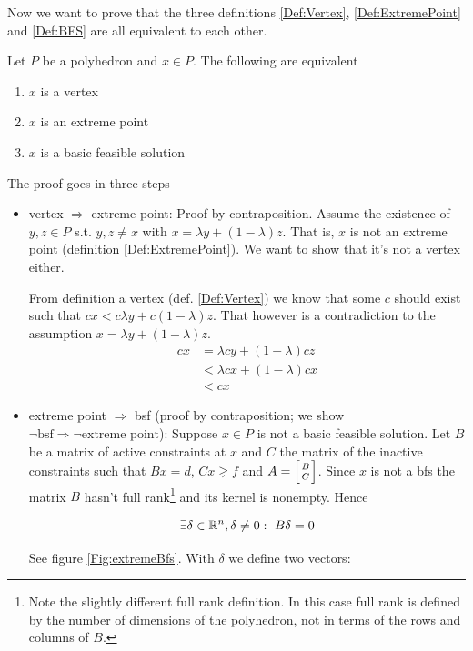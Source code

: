 Now we want to prove that the three definitions \ref{Def:Vertex}, \ref{Def:ExtremePoint} and \ref{Def:BFS} are all equivalent to each other.

\begin{thm} \label{Thm:cornerEquiv} Let $P$ be a polyhedron and $x\in P$. The following are equivalent
\begin{enumerate}
\item $x$ is a vertex
\item $x$ is an extreme point
\item $x$ is a basic feasible solution
\end{enumerate}
\end{thm}

\begin{pr} The proof goes in three steps
\begin{itemize}
\item vertex $\Rightarrow$ extreme point: Proof by contraposition. Assume the existence of $y,z \in P$ s.t. $y,z\neq x$ with $x= \lambda y + (1-\lambda )z$. That is, $x$ is not an extreme point (definition \ref{Def:ExtremePoint}). We want to show that it's not a vertex either.

From definition a vertex (def. \ref{Def:Vertex}) we know that some $c$ should exist such that $c x < c \lambda y  + c (1-\lambda) z$. That however is a contradiction to the assumption $x= \lambda y + (1-\lambda )z$.
\begin{align*}
cx &= \lambda cy +(1-\lambda)cz\\
   &< \lambda cx + (1-\lambda)cx\\
   &< cx
\end{align*}

\item extreme point $\Rightarrow$ bsf (proof by contraposition; we show $\neg \text{bsf} \Rightarrow \neg \text{extreme point}$): Suppose $x\in P$ is not a basic feasible solution. Let $B$ be a matrix of active constraints at $x$ and $C$ the matrix of the inactive constraints such that $Bx=d$, $Cx\gneq f$ and $A = \left[B\atop C\right]$. Since $x$ is not a bfs the matrix $B$ hasn't full rank\footnote{Note the slightly different full rank definition. In this case full rank is defined by the number of dimensions of the polyhedron, not in terms of the rows and columns of $B$.} and its kernel is nonempty. Hence

\[\exists \delta \in \R^n, \delta \neq 0:\ B\delta =0\]

See figure \ref{Fig:extremeBfs}. With $\delta$ we define two vectors:


\end{itemize}
\end{pr}
